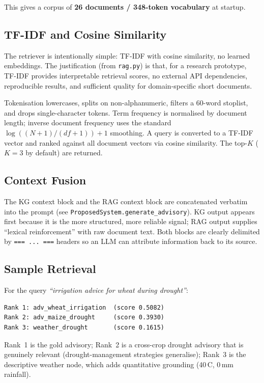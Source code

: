 \documentclass[11pt,a4paper]{article}
\begin{document}
This gives a corpus of \textbf{26 documents / 348-token vocabulary}
at startup.

\subsection{TF-IDF and Cosine Similarity}
The retriever is intentionally simple: TF-IDF with cosine similarity,
no learned embeddings. The justification (from \texttt{rag.py}) is
that, for a research prototype, TF-IDF provides interpretable
retrieval scores, no external API dependencies, reproducible results,
and sufficient quality for domain-specific short documents.

Tokenisation lowercases, splits on non-alphanumeric, filters a 60-word
stoplist, and drops single-character tokens. Term frequency is
normalised by document length; inverse document frequency uses the
standard $\log\!\left((N+1)/(df+1)\right) + 1$ smoothing. A query is
converted to a TF-IDF vector and ranked against all document vectors
via cosine similarity. The top-$K$ ($K = 3$ by default) are returned.

\subsection{Context Fusion}
The KG context block and the RAG context block are concatenated
verbatim into the prompt (see
\texttt{ProposedSystem.generate\_advisory}). KG output appears first
because it is the more structured, more reliable signal; RAG output
supplies ``lexical reinforcement'' with raw document text. Both blocks
are clearly delimited by \texttt{=== ... ===} headers so an LLM can
attribute information back to its source.

\subsection{Sample Retrieval}
For the query \emph{``irrigation advice for wheat during drought''}:

\begin{lstlisting}
Rank 1: adv_wheat_irrigation  (score 0.5082)
Rank 2: adv_maize_drought     (score 0.3930)
Rank 3: weather_drought       (score 0.1615)
\end{lstlisting}

Rank~1 is the gold advisory; Rank~2 is a cross-crop drought advisory
that is genuinely relevant (drought-management strategies generalise);
Rank~3 is the descriptive weather node, which adds quantitative
grounding (40\,\textdegree C, 0\,mm rainfall).
\end{document}
